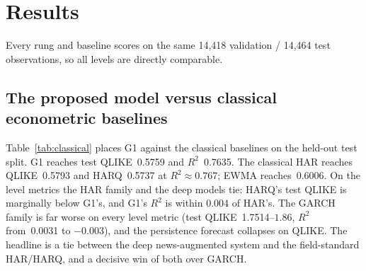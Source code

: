 \documentclass[runningheads]{llncs}
\newcommand{\GtestQ}{0.5759}     %
\newcommand{\GtestRsq}{0.7635}   %
\newcommand{\HARtestQ}{0.5793}   %
\newcommand{\HARQtestQ}{0.5737}  %
\newcommand{\EWMAtestQ}{0.6006}  %
\newcommand{\GARCHtestQ}{1.7514} %
\newcommand{\GARCHtestRsq}{0.0031}%
\newcommand{\nval}{14{,}418}
\newcommand{\ntest}{14{,}464}
\begin{document}
\section{Results}
\label{sec:results}
Every rung and baseline scores on the same \nval{} validation / \ntest{} test observations, so all levels
are directly comparable.

\subsection{The proposed model versus classical econometric baselines}
\label{sec:baselines}
Table~\ref{tab:classical} places G1 against the classical baselines on the held-out test split. G1 reaches
test QLIKE~\GtestQ{} and $R^2$~\GtestRsq. The classical HAR reaches QLIKE~\HARtestQ{} and HARQ~\HARQtestQ{}
at $R^2\approx0.767$; EWMA reaches~\EWMAtestQ. On the level metrics the HAR family and the deep models tie:
HARQ's test QLIKE is marginally below G1's, and G1's $R^2$ is within $0.004$ of HAR's. The GARCH family is
far worse on every level metric (test QLIKE~\GARCHtestQ{}--$1.86$, $R^2$ from~\GARCHtestRsq{} to $-0.003$),
and the persistence forecast collapses on QLIKE. The headline is a tie between the deep news-augmented
system and the field-standard HAR/HARQ, and a decisive win of both over GARCH.
\end{document}
